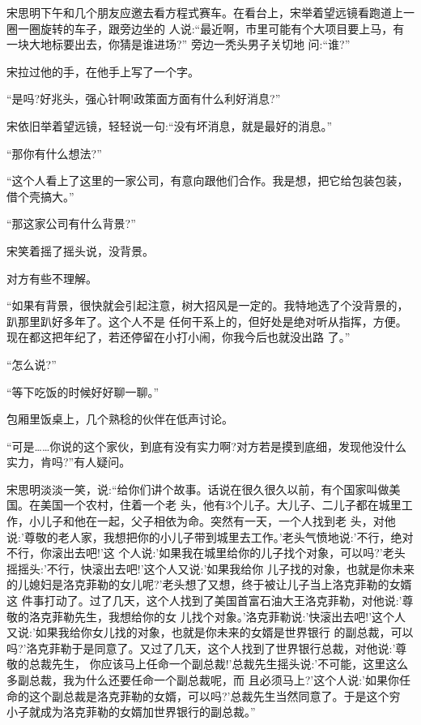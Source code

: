 \documentclass[11pt,a4paper,onecolumn]{article}
\begin{document}
宋思明下午和几个朋友应邀去看方程式赛车。在看台上，宋举着望远镜看跑道上一圈一圈旋转的车子，跟旁边坐的
人说:``最近啊，市里可能有个大项目要上马，有一块大地标要出去，你猜是谁进场?'' 旁边一秃头男子关切地
问:``谁?''

宋拉过他的手，在他手上写了一个字。

``是吗?好兆头，强心针啊!政策面方面有什么利好消息?''

宋依旧举着望远镜，轻轻说一句:``没有坏消息，就是最好的消息。''

``那你有什么想法?''

``这个人看上了这里的一家公司，有意向跟他们合作。我是想，把它给包装包装，借个壳搞大。''

``那这家公司有什么背景?''

宋笑着摇了摇头说，没背景。

对方有些不理解。

``如果有背景，很快就会引起注意，树大招风是一定的。我特地选了个没背景的，趴那里趴好多年了。这个人不是
任何干系上的，但好处是绝对听从指挥，方便。现在都这把年纪了，若还停留在小打小闹，你我今后也就没出路
了。''

``怎么说?''

``等下吃饭的时候好好聊一聊。''

包厢里饭桌上，几个熟稔的伙伴在低声讨论。

``可是……你说的这个家伙，到底有没有实力啊?对方若是摸到底细，发现他没什么实力，肯吗?''有人疑问。

宋思明淡淡一笑，说:``给你们讲个故事。话说在很久很久以前，有个国家叫做美国。在美国一个农村，住着一个老
头，他有3个儿子。大儿子、二儿子都在城里工作，小儿子和他在一起，父子相依为命。突然有一天，一个人找到老
头，对他说:'尊敬的老人家，我想把你的小儿子带到城里去工作。'老头气愤地说:'不行，绝对不行，你滚出去吧!'这
个人说:'如果我在城里给你的儿子找个对象，可以吗?'老头摇摇头:'不行，快滚出去吧!'这个人又说:'如果我给你
儿子找的对象，也就是你未来的儿媳妇是洛克菲勒的女儿呢?'老头想了又想，终于被让儿子当上洛克菲勒的女婿这
件事打动了。过了几天，这个人找到了美国首富石油大王洛克菲勒，对他说:'尊敬的洛克菲勒先生，我想给你的女
儿找个对象。'洛克菲勒说:'快滚出去吧!'这个人又说:'如果我给你女儿找的对象，也就是你未来的女婿是世界银行
的副总裁，可以吗?'洛克菲勒于是同意了。又过了几天，这个人找到了世界银行总裁，对他说:'尊敬的总裁先生，
你应该马上任命一个副总裁!'总裁先生摇头说:'不可能，这里这么多副总裁，我为什么还要任命一个副总裁呢，而
且必须马上?'这个人说:'如果你任命的这个副总裁是洛克菲勒的女婿，可以吗?'总裁先生当然同意了。于是这个穷
小子就成为洛克菲勒的女婿加世界银行的副总裁。''
\end{document}

